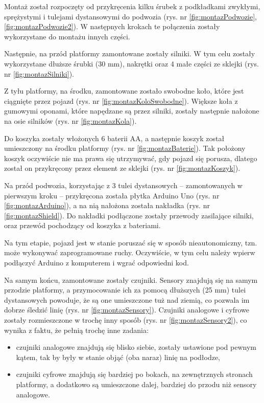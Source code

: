 \documentclass[11pt]{article}
\begin{document}
Montaż został rozpoczęty od przykręcenia kilku śrubek z podkładkami zwykłymi, sprężystymi i tulejami dystansowymi do podwozia (rys. nr \ref{fig:montazPodwozie}, \ref{fig:montazPodwozie2}). W następnych krokach te połączenia zostały wykorzystane do montażu innych części.

Następnie, na przód platformy zamontowane zostały silniki. W tym celu zostały wykorzystane dłuższe śrubki (30 mm), nakrętki oraz 4 małe części ze sklejki (rys. nr \ref{fig:montazSilniki}).

Z tyłu platformy, na środku, zamontowane zostało swobodne koło, które jest ciągnięte przez pojazd (rys. nr \ref{fig:montazKoloSwobodne}). Większe koła z gumowymi oponami, które napędzane są przez silniki, zostały następnie nałożone na osie silników (rys. nr \ref{fig:montazKola}).

Do koszyka zostały włożonych 6 baterii AA, a następnie koszyk został umieszczony na środku platformy (rys. nr \ref{fig:montazBaterie}). Tak położony koszyk oczywiście nie ma prawa się utrzymywać, gdy pojazd się porusza, dlatego został on przykręcony przez element ze sklejki (rys. nr \ref{fig:montazKoszyk}).

Na przód podwozia, korzystając z 3 tulei dystansowych -- zamontowanych w pierwszym kroku -- przykręcona została płytka Arduino Uno (rys. nr \ref{fig:montazArduino}), a na nią nałożona została nakładka (rys. nr \ref{fig:montazShield}). Do nakładki podłączone zostały przewody zasilające silniki, oraz przewód pochodzący od koszyka z bateriami.

Na tym etapie, pojazd jest w stanie poruszać się w sposób nieautonomiczny, tzn. może wykonywać zaprogramowane ruchy. Oczywiście, w tym celu należy wpierw podłączyć Arduino z komputerem i wgrać odpowiedni kod.

Na samym końcu, zamontowane zostały czujniki. Sensory znajdują się na samym przodzie platformy, a przymocowanie ich za pomocą dłuższych (25 mm) tulei dystansowych powoduje, że są one umieszczone tuż nad ziemią, co pozwala im dobrze śledzić linię (rys. nr \ref{fig:montazSensory}). Czujniki analogowe i cyfrowe zostały rozmieszczone w trochę inny sposób (rys. nr \ref{fig:montazSensory2}), co wynika z faktu, że pełnią trochę inne zadania:
\begin{itemize}
\item czujniki analogowe znajdują się blisko siebie, zostały ustawione pod pewnym kątem, tak by były w stanie objąć (oba naraz) linię na podłodze,
\item czujniki cyfrowe znajdują się bardziej po bokach, na zewnętrznych stronach platformy, a dodatkowo są umieszczone dalej, bardziej do przodu niż sensory analogowe.
\end{itemize}
\end{document}
